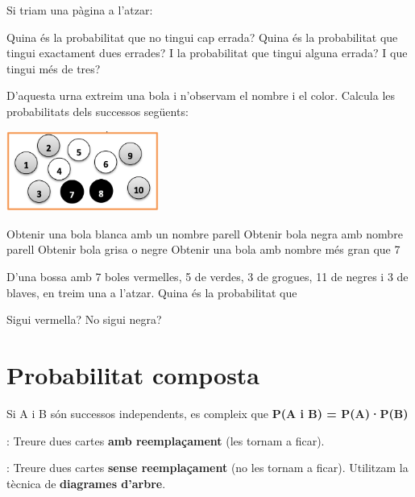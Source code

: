 \begin{mylist}
Si triam una pàgina a l'atzar:
\begin{tasks} 
	\task  Quina és la probabilitat que no tingui cap errada?
	\task  Quina és la probabilitat que tingui exactament dues errades?
	\task  I la probabilitat que tingui alguna errada? I que tingui més de tres?
\end{tasks}
 

  

\exer  D'aquesta urna extreim una bola i n'observam el nombre i el color. Calcula les probabilitats dels successos següents:
\begin{center}
	\includegraphics[width=5cm]{img-04/image11}
\end{center}
\begin{tasks} 
	\task  Obtenir una bola blanca amb un nombre parell
	\task  Obtenir bola negra amb nombre parell
	\task  Obtenir bola grisa o negre
	\task  Obtenir una bola amb nombre més gran que 7
\end{tasks}


\exer  D'una bossa amb 7 boles vermelles, 5 de verdes, 3 de grogues, 11 de negres i 3 de blaves, en treim una a l'atzar. Quina és la probabilitat que 
\begin{tasks} 
	\task    Sigui vermella?    
	\task  No sigui negra?
\end{tasks}

\end{mylist}


\section{Probabilitat composta}

\begin{theorybox}

                      Si A i B són successos independents, es compleix que \textbf{P(A i B) = P(A)·P(B)                           }
                      
                      : Treure dues cartes\textbf{ amb reemplaçament} (les tornam a ficar).


                     : Treure dues cartes \textbf{sense reemplaçament} (no les tornam a ficar). Utilitzam la tècnica de    \textbf{ diagrames d'arbre}.
\end{theorybox}

